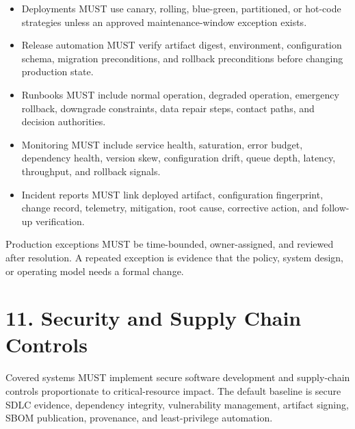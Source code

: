 \documentclass[11pt]{article}
\begin{document}
\begin{itemize}
  \item Deployments MUST use canary, rolling, blue-green, partitioned, or hot-code strategies unless an approved maintenance-window exception exists.
  \item Release automation MUST verify artifact digest, environment, configuration schema, migration preconditions, and rollback preconditions before changing production state.
  \item Runbooks MUST include normal operation, degraded operation, emergency rollback, downgrade constraints, data repair steps, contact paths, and decision authorities.
  \item Monitoring MUST include service health, saturation, error budget, dependency health, version skew, configuration drift, queue depth, latency, throughput, and rollback signals.
  \item Incident reports MUST link deployed artifact, configuration fingerprint, change record, telemetry, mitigation, root cause, corrective action, and follow-up verification.
\end{itemize}
Production exceptions MUST be time-bounded, owner-assigned, and reviewed after resolution. A repeated exception is evidence that the policy, system design, or operating model needs a formal change.


\hypertarget{sec-security-supply-chain}{}
\section*{11. Security and Supply Chain Controls}
Covered systems MUST implement secure software development and supply-chain controls proportionate to critical-resource impact. The default baseline is secure SDLC evidence, dependency integrity, vulnerability management, artifact signing, SBOM publication, provenance, and least-privilege automation.
\end{document}
